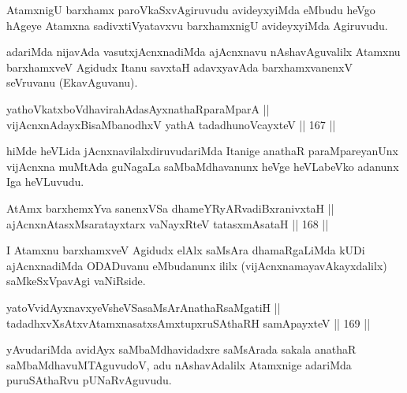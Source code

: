 \begin{artha}
AtamxnigU barxhamx paroVkaSxvAgiruvudu avideyxyiMda eMbudu heVgo
hAgeye Atamxna sadivxtiVyatavxvu barxhamxnigU avideyxyiMda Agiruvudu.
\end{artha}

\begin{artha}
adariMda nijavAda vasutxjAcnxnadiMda ajAcnxnavu nAshavAguvalilx
Atamxnu barxhamxveV Agidudx Itanu savxtaH adavxyavAda barxhamxvanenxV
seVruvanu (EkavAguvanu).
\end{artha}


\begin{shl}
yathoVkatxboVdhavirahAdasAyxnathaRparaMparA || \\
vijAcnxnAdayxBisaMbanodhxV yathA tadadhunoVcayxteV \hfill || 167 ||  
\end{shl}

\begin{artha}
hiMde heVLida jAcnxnavilalxdiruvudariMda Itanige anathaR
paraMpareyanUnx vijAcnxna muMtAda guNagaLa saMbaMdhavanunx heVge
heVLabeVko adanunx Iga heVLuvudu.
\end{artha}

\begin{shl}
AtAmx barxhemxYva sanenxVSa dhameYRyARvadiBxranivxtaH || \\
ajAcnxnAtasxMsaratayxtarx vaNayxRteV tatasxmAsataH \hfill || 168 ||  
\end{shl}


\begin{artha}
I Atamxnu barxhamxveV Agidudx elAlx saMsAra dhamaRgaLiMda kUDi
ajAcnxnadiMda ODADuvanu eMbudanunx ililx (vijAcnxnamayavAkayxdalilx)
saMkeSxVpavAgi vaNiRside.
\end{artha}


\begin{shl}
yatoV\s vidAyxnavxyeV\s sheVSasaMsArAnathaRsaMgatiH || \\
tadadhxvXsAtxvAtamxnasatxsAmxtupxruSAthaRH samApayxteV \hfill || 169 ||  
\end{shl}

\begin{artha}
yAvudariMda avidAyx saMbaMdhavidadxre saMsArada sakala anathaR
saMbaMdhavuMTAguvudoV, adu nAshavAdalilx Atamxnige adariMda
puruSAthaRvu pUNaRvAguvudu.
\end{artha}

